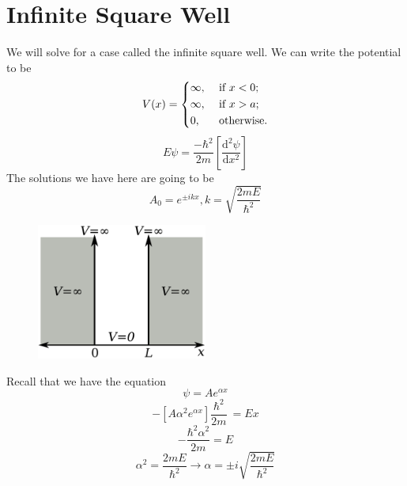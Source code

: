\section{Infinite Square Well}
\begin{remark}
    
We will solve for a case called the infinite square well. We can write the potential to be
\[
    V(x) = \begin{dcases}
        \infty , &\text{ if } x< 0  ;\\
        \infty , &\text{ if } x>a ;\\
        0, &\text{ otherwise} .
    \end{dcases}
\]
\[
    E \psi  = \frac{-\hbar ^{2} }{2m} \left[ \frac{\mathrm{d}^{2} \psi }{\mathrm{d}x^{2} }  \right] 
\] 
The solutions we have here are going to be 
\[
    A_0 = e^{\pm ikx}, k = \sqrt{\frac{2mE}{\hbar ^{2} }} 
\]
\begin{figure}[H]
    \centering
    \includegraphics[width=0.5\textwidth]{Figures/kpZUe.png}
    \caption{}
    \label{fig:}
\end{figure}
Recall that we have the equation 
\[
    \psi  = Ae^{\alpha x} 
\]
\[
     -\left[ A \alpha ^{2}  e^{\alpha x} \right] \frac{\hbar ^{2} }{2m}\ = Ex
\]
\[
    -\frac{\hbar ^{2} \alpha ^{2} }{2m} = E
\]
\[
    \alpha ^{2}  = \frac{2mE}{\hbar ^{2} } \to  \alpha  = \pm i \sqrt{\frac{2mE}{\hbar ^{2} }} 
\]
\end{remark}
